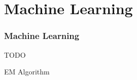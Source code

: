 \part{Machine Learning}
\section{Machine Learning}




\newpage
TODO
\begin{description}
\item EM Algorithm
\end{description}